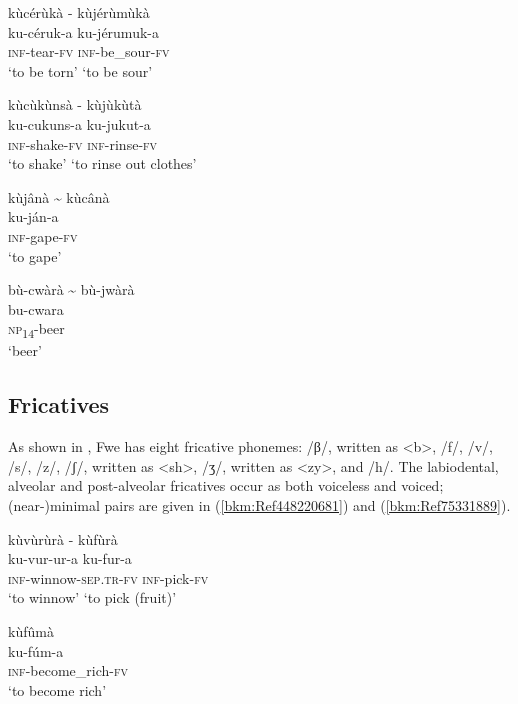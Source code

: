 \ea
\label{bkm:Ref71882646}
kùcérùkà \tab    - \tab kùjérùmùkà\\
ku-céruk-a \tab\tab     ku-jérumuk-a\\
\textsc{inf}-tear-\textsc{fv} \tab\tab     \textsc{inf}-be\_sour-\textsc{fv}\\
\glt ‘to be torn’  \tab\tab   ‘to be sour’
\z

\ea
\label{bkm:Ref75331768}
kùcùkùnsà \tab   - \tab kùjùkùtà\\
ku-cukuns-a  \tab\tab    ku-jukut-a\\
\textsc{inf}-shake-\textsc{fv}   \tab\tab   \textsc{inf}-rinse-\textsc{fv}\\
\glt ‘to shake’ \tab\tab    ‘to rinse out clothes’
\z

\ea
\label{bkm:Ref75331777}
kùjânà {\textasciitilde} kùcânà\\
ku-ján-a\\
\textsc{inf}-gape-\textsc{fv}\\
\glt ‘to gape’
\z

\ea
\label{bkm:Ref71883077}
bù-cwàrà {\textasciitilde} bù-jwàrà\\
bu-cwara\\
\textsc{np}\textsubscript{14}-beer\\
\glt ‘beer’
\z
\subsection{Fricatives}

As shown in , Fwe has eight fricative phonemes: /β/, written as <b>, /f/, /v/, /s/, /z/, /ʃ/, written as <sh>, /ʒ/, written as <zy>, and /h/. The labiodental, alveolar and post-alveo\-lar fricatives occur as both voiceless and voiced; (near-)minimal pairs are given in (\ref{bkm:Ref448220681}) and (\ref{bkm:Ref75331889}).

\ea
\label{bkm:Ref448220681}
kùvùrùrà    \tab  - \tab  kùfùrà\\
ku-vur-ur-a   \tab\tab     ku-fur-a\\
\textsc{inf}-winnow-\textsc{sep}.\textsc{tr}-\textsc{fv}   \tab \textsc{inf}-pick-\textsc{fv}\\
‘to winnow’   \tab \tab    ‘to pick (fruit)’\label{bkm:Ref448220682}
\z

\ea
\label{bkm:Ref75331889}
\ea
\glll kùfûmà\\
ku-fúm-a\\
\textsc{inf}-become\_rich-\textsc{fv}\\
\glt ‘to become rich’

